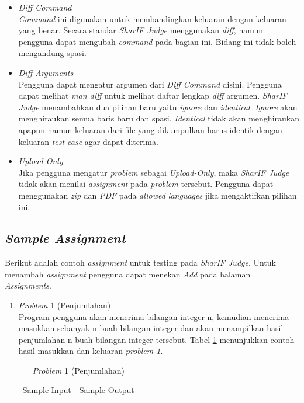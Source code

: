 \documentclass[a4paper,twoside]{article}
\begin{document}
\begin{enumerate}
\begin{itemize}
			\item \textit{Diff Command} \\
			\textit{Command} ini digunakan untuk membandingkan keluaran dengan keluaran yang benar. Secara standar \textit{SharIF Judge} menggunakan \textit{diff}, namun pengguna dapat mengubah \textit{command} pada bagian ini. Bidang ini tidak boleh mengandung spasi.
			
			\item \textit{Diff Arguments} \\
			Pengguna dapat mengatur argumen dari \textit{Diff Command} disini. Pengguna dapat melihat \textit{man diff} untuk melihat daftar lengkap \textit{diff} argumen. \textit{SharIF Judge} menambahkan dua pilihan baru yaitu \textit{ignore} dan \textit{identical}. \textit{Ignore} akan menghiraukan semua baris baru dan spasi. \textit{Identical} tidak akan menghiraukan apapun namun keluaran dari file yang dikumpulkan harus identik dengan keluaran \textit{test case} agar dapat diterima.
			
			\item \textit{Upload Only} \\
			Jika pengguna mengatur \textit{problem} sebagai \textit{Upload-Only}, maka \textit{SharIF Judge} tidak akan menilai \textit{assignment} pada \textit{problem} tersebut. Pengguna dapat menggunakan \textit{zip} dan \textit{PDF} pada \textit{allowed languages} jika mengaktifkan pilihan ini.
			
		\end{itemize}
		
		\subsection*{\textit{Sample Assignment}}
		\label{subsec:sample_assignment}
		Berikut adalah contoh \textit{assignment} untuk testing pada \textit{SharIF Judge}. Untuk menambah \textit{assignment} pengguna dapat menekan \textit{Add} pada halaman \textit{Assignments}.
		
		\begin{enumerate}
			\item \textit{Problem} 1 (Penjumlahan) \\
			Program pengguna akan menerima bilangan integer n, kemudian menerima masukkan sebanyak n buah bilangan integer dan akan menampilkan hasil penjumlahan n buah bilangan integer tersebut. Tabel \ref{tab:problem_sum} menunjukkan contoh hasil masukkan dan keluaran \textit{problem 1}.
			
			\begin{table}[H]
				\centering 
				\caption{\textit{Problem} 1 (Penjumlahan)}
				\label{tab:problem_sum}
				\begin{tabular}{|c|c|}
					\hline
					Sample Input & Sample Output\\
					

\end{tabular}
\end{table}
\end{enumerate}
\end{enumerate}
\end{document}
